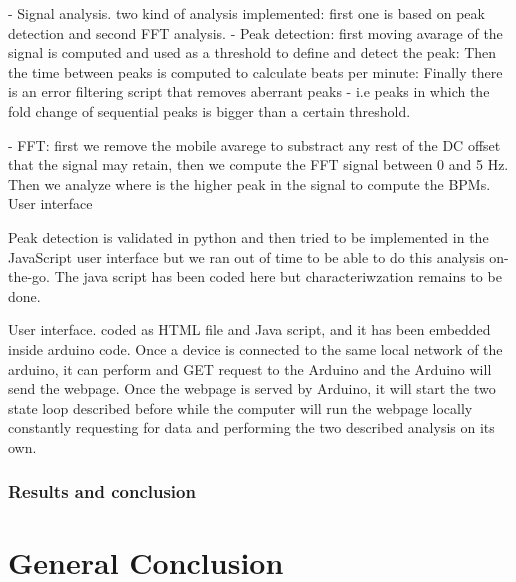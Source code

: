 \documentclass[conference]{IEEEtran}
\begin{document}
          - Signal analysis. two kind of analysis implemented: first one is based on peak detection and second FFT analysis.
           - Peak detection: first moving avarage of the signal is computed and used as a threshold to define and detect the peak: Then the time between peaks is computed to calculate beats per minute:
           Finally there is an error filtering script that removes aberrant peaks - i.e peaks in which the fold change of sequential peaks is bigger than a certain threshold.

           - FFT: first we remove the mobile avarege to substract any rest of the DC offset that the signal may retain, then we compute the FFT signal between 0 and 5 Hz. Then we analyze where is the higher peak in the signal to compute the BPMs.
           User interface

           Peak detection is validated in python and then tried to be implemented in the JavaScript user interface but we ran out of time to be able to do this analysis on-the-go. 
           The java script has been coded here but characteriwzation remains to be done.

           User interface. coded as HTML file and Java script, and it has been embedded inside arduino code. Once a device is connected to the same local network of the arduino, it can perform and GET request to the Arduino and the Arduino will send the webpage.
           Once the webpage is served by Arduino, it will start the two state loop described before while the computer will run the webpage locally constantly requesting for data and performing the two described analysis on its own.
           

      \subsubsection{Results and conclusion}
\section{General Conclusion} %
\end{document}
